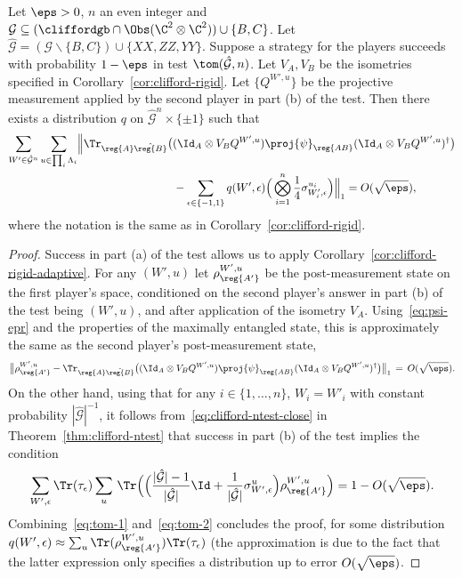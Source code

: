 \begin{corollary}\label{cor:clifford-rigid-adaptive}
Let $\eps>0$, $n$ an even integer and $\mathcal{G} \subseteq (\cliffordgb \cap \Obs(\C^2 \otimes \C^2))\cup\{B,C\}$. Let $\hat{\mathcal{G}} = (\mathcal{G}\backslash\{B,C\}) \cup \{XX,ZZ,YY\}$. Suppose a strategy for the players succeeds with probability $1-\eps$ in test $\tom(\hat{\mathcal{G}},n)$. Let $V_A,V_B$ be the isometries specified in Corollary~\ref{cor:clifford-rigid}. Let $\{Q^{W',u}\}$ be the projective measurement applied by the second player in part (b) of the test. Then there exists a distribution $q$ on $\hat{\mathcal{G}}^n \times \{\pm 1\}$ such that 
\begin{align*}
 \sum_{W'\in\hat{\mathcal{G}}^n} \sum_{u\in\prod_i \Lambda_i} &\Big\| \Tr_{\reg{A}\hat{\reg{B}}} \big((\Id_A \otimes V_B Q^{W',u} )\proj{\psi}_{\reg{AB}} (\Id_A \otimes V_B Q^{W',u})^\dagger\big)\\
&\hskip3cm - \sum_{\epsilon\in\{-1,1\}}  q(W',\epsilon)  \Big( \bigotimes_{i=1}^n \frac{1}{4}\sigma_{W'_i,\epsilon}^{u_i}\Big) \Big\|_1 = O(\sqrt{\eps}),
\end{align*}
where the notation is the same as in Corollary~\ref{cor:clifford-rigid}. 
\end{corollary}

\begin{proof}
Success in part (a) of the test allows us to apply Corollary~\ref{cor:clifford-rigid-adaptive}. For any $(W',u)$ let $\rho_{\reg{A'}}^{W',u}$ be the post-measurement state on the first player's space, conditioned on the second player's answer  in part (b) of the test being $(W',u)$, and after application of the isometry $V_A$. Using~\eqref{eq:psi-epr} and the properties of the maximally entangled state,  this is approximately the same as the second player's post-measurement state, 
\begin{equation}\label{eq:tom-1}
\big\|\rho_{\reg{A'}}^{W',u} - \Tr_{\reg{A}\hat{\reg{B}}}\big((\Id_A\otimes V_B Q^{W',u} )\proj{\psi}_{\reg{AB}}(\Id_A\otimes V_B Q^{W',u} )^\dagger\big)\big\|_1 \,=\, O(\sqrt{\eps}).
\end{equation}
On the other hand, using that for any $i\in\{1,\ldots,n\}$, $W_i=W'_i$ with constant probability $|\hat{\mathcal{G}}|^{-1}$, 
it follows from~\eqref{eq:clifford-ntest-close} in Theorem~\ref{thm:clifford-ntest} that success in part (b) of the test implies the condition
\begin{equation}\label{eq:tom-2}
\sum_{W',\epsilon }\Tr(\tau_\epsilon) \sum_u\, \Tr\Big(\Big( \frac{|\hat{\mathcal{G}}|-1}{|\hat{\mathcal{G}}|}\Id + \frac{1}{|\hat{\mathcal{G}}|}\sigma_{W',\epsilon}^u \Big) \rho_{\reg{A'}}^{W',u}\Big)  = 1- O(\sqrt{\eps}). 
\end{equation}
Combining~\eqref{eq:tom-1} and~\eqref{eq:tom-2} concludes the proof, for some distribution $q(W',\epsilon) \approx \sum_u \Tr(\rho_{\reg{A'}}^{W',u})\Tr(\tau_\epsilon)$ (the approximation is due to the fact that the latter expression only specifies a distribution up to error $O(\sqrt{\eps})$.
\end{proof}


